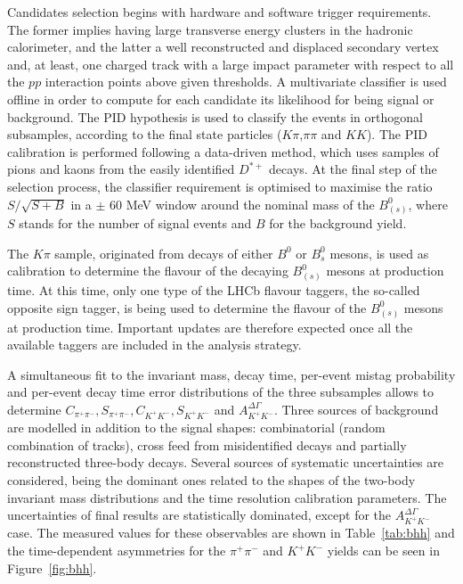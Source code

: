 \documentclass[12pt]{article}
\begin{document}
Candidates selection begins with hardware and software trigger requirements. The former implies having large transverse energy clusters in the hadronic calorimeter, and the latter a well reconstructed and displaced secondary vertex and, at least, one charged track with a large impact parameter with respect to all the $pp$ interaction points above given thresholds. A multivariate classifier is used offline in order to compute for each candidate its likelihood for being signal or background. The PID hypothesis is used to classify the events in orthogonal subsamples, according to the final state particles  ($K\pi$,$\pi\pi$ and $KK$). The PID calibration is performed following a data-driven method, which uses samples of pions and kaons from the easily identified $D^{*+}$ decays. At the final step of the selection process, the classifier requirement is optimised to maximise the ratio $S/\sqrt{S+B}$ in a $\pm$ 60 MeV window around the nominal mass of the $B^0_{(s)}$, where $S$ stands for the number of signal events and $B$ for the background yield.

The $K\pi$ sample, originated from decays of either $B^0$ or $B^0_s$ mesons, is used as calibration to determine the flavour of the decaying $B^0_{(s)}$ mesons at production time. At this time, only one type of the LHCb flavour taggers, the so-called opposite sign tagger, is being used to determine the flavour of the $B^0_{(s)}$ mesons at production time. Important updates are therefore expected once all the available taggers are included in the analysis strategy.

A simultaneous fit to the invariant mass, decay time, per-event mistag probability and per-event decay time error distributions of the three subsamples allows to determine $C_{\pi^+\pi^-}, S_{\pi^+\pi^-}, C_{K^+K^-}, S_{K^+K^-}$ and $A_{K^+K^-}^{\Delta\Gamma}$. Three sources of background are modelled in addition to the signal shapes: combinatorial (random combination of tracks), cross feed from misidentified decays and partially reconstructed three-body decays. Several sources of systematic uncertainties are considered, being the dominant ones related to the shapes of the two-body invariant mass distributions and the time resolution calibration parameters. The uncertainties of final results are statistically dominated, except for the $A_{K^+K^-}^{\Delta\Gamma}$ case. The measured values for these observables are shown in Table~\ref{tab:bhh} and the time-dependent asymmetries for the $\pi^+\pi^-$ and $K^+K^-$ yields can be seen in Figure~\ref{fig:bhh}. 
\end{document}
